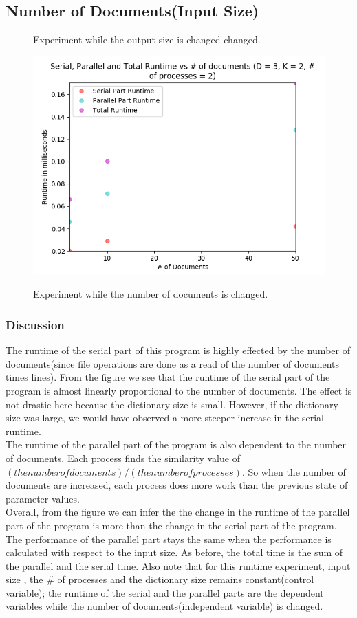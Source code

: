 \documentclass{article}
\begin{document}
\subsection{Number of Documents(Input Size)}

\begin{figure}[H]
\centering\caption{Experiment while the output size is changed changed.}
\includegraphics[width=\linewidth]{assets/D_3_K_2_numproc_2.png}
\label{fig:test1}
\vspace{-2pt}
\caption{Experiment while the number of documents is changed.}
\end{figure}

\subsubsection{Discussion}
\qquad The runtime of the serial part of this program is highly effected by the number of documents(since file operations are done as a read of the number of documents times lines). From the figure we see that the runtime of the serial part of the program is almost linearly proportional to the number of documents. The effect is not drastic here because the dictionary size is small. However, if the dictionary size was large, we would have observed a more steeper increase in the serial runtime.\\
\null \qquad The runtime of the parallel part of the program is also dependent to the number of documents. Each process finds the similarity value of  $ ( the number of documents )/( the number of processes )$. So when the number of documents are increased, each process does more work than the previous state of parameter values. \\
\null \qquad Overall, from the figure we can infer the the change in the runtime of the parallel part of the program is more than the change in the serial part of the program. The performance of the parallel part stays the same when the performance is calculated with respect to the input size. As before, the total time is the sum of the parallel and the serial time. Also note that for this runtime experiment, input size , the \# of processes and the dictionary size remains  constant(control variable); the runtime of the serial and the parallel parts are the dependent variables while the number of documents(independent variable) is changed.
\end{document}
